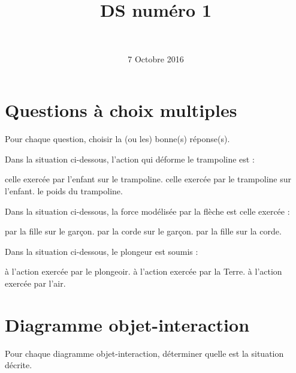 \documentclass[a4paper,11pt]{exam}
\author{\ }
\date{7 Octobre 2016}
\title{DS num\'ero 1}
\begin{document}
%	

	\maketitle
	
\section{Questions à choix multiples}
Pour chaque question, choisir la (ou les) bonne(s) réponse(s).

\begin{questions}
	\question Dans la situation ci-dessous, l'action qui déforme le trampoline est :
	
	\begin{checkboxes}
		\choice celle exercée par l'enfant sur le trampoline.
		\choice celle exercée par le trampoline sur l'enfant.
		\choice le poids du trampoline.
	\end{checkboxes}
	
	\question Dans la situation ci-dessous, la force modélisée par la flèche est celle exercée :
	
	\begin{checkboxes}
		\choice par la fille sur le garçon.
		\choice par la corde sur le garçon.
		\choice par la fille sur la corde.
	\end{checkboxes}

	\question Dans la situation ci-dessous, le plongeur est soumis :
	
	\begin{checkboxes}
		\choice à l'action exercée par le plongeoir.
		\choice à l'action exercée par la Terre.
		\choice à l'action exercée par l'air.
	\end{checkboxes}


\end{questions}


\section{Diagramme objet-interaction}

Pour chaque diagramme objet-interaction, déterminer quelle est la situation décrite.
\end{document}
